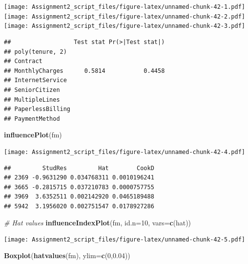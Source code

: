 \documentclass[
]{article}
\newenvironment{Shaded}{\begin{snugshade}}{\end{snugshade}}
\newcommand{\AttributeTok}[1]{\textcolor[rgb]{0.13,0.29,0.53}{#1}}
\newcommand{\CommentTok}[1]{\textcolor[rgb]{0.56,0.35,0.01}{\textit{#1}}}
\newcommand{\DecValTok}[1]{\textcolor[rgb]{0.00,0.00,0.81}{#1}}
\newcommand{\FloatTok}[1]{\textcolor[rgb]{0.00,0.00,0.81}{#1}}
\newcommand{\FunctionTok}[1]{\textcolor[rgb]{0.13,0.29,0.53}{\textbf{#1}}}
\newcommand{\NormalTok}[1]{#1}
\newcommand{\StringTok}[1]{\textcolor[rgb]{0.31,0.60,0.02}{#1}}
\begin{document}
\texttt{[image: Assignment2\_script\_files/figure-latex/unnamed-chunk-42-1.pdf]}
\texttt{[image: Assignment2\_script\_files/figure-latex/unnamed-chunk-42-2.pdf]}
\texttt{[image: Assignment2\_script\_files/figure-latex/unnamed-chunk-42-3.pdf]}

\begin{verbatim}
##                  Test stat Pr(>|Test stat|)
## poly(tenure, 2)                            
## Contract                                   
## MonthlyCharges      0.5814           0.4458
## InternetService                            
## SeniorCitizen                              
## MultipleLines                              
## PaperlessBilling                           
## PaymentMethod
\end{verbatim}

\begin{Shaded}
\begin{Highlighting}[]
\FunctionTok{influencePlot}\NormalTok{(fm)}
\end{Highlighting}
\end{Shaded}

\texttt{[image: Assignment2\_script\_files/figure-latex/unnamed-chunk-42-4.pdf]}

\begin{verbatim}
##         StudRes         Hat        CookD
## 2369 -0.9631290 0.034768311 0.0010196241
## 3665 -0.2815715 0.037210783 0.0000757755
## 3969  3.6352511 0.002142920 0.0465189488
## 5942  3.1956020 0.002751547 0.0178927286
\end{verbatim}

\begin{Shaded}
\begin{Highlighting}[]
\CommentTok{\# Hat values}
\FunctionTok{influenceIndexPlot}\NormalTok{(fm, }\AttributeTok{id.n=}\DecValTok{10}\NormalTok{, }\AttributeTok{vars=}\FunctionTok{c}\NormalTok{(}\StringTok{\textquotesingle{}hat\textquotesingle{}}\NormalTok{))}
\end{Highlighting}
\end{Shaded}

\texttt{[image: Assignment2\_script\_files/figure-latex/unnamed-chunk-42-5.pdf]}

\begin{Shaded}
\begin{Highlighting}[]
\FunctionTok{Boxplot}\NormalTok{(}\FunctionTok{hatvalues}\NormalTok{(fm), }\AttributeTok{ylim=}\FunctionTok{c}\NormalTok{(}\DecValTok{0}\NormalTok{,}\FloatTok{0.04}\NormalTok{))}
\end{Highlighting}
\end{Shaded}
\end{document}
